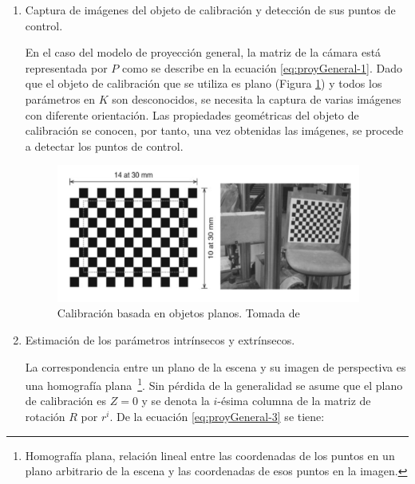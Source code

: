 \begin{enumerate}
	\item Captura de imágenes del objeto de calibración y detección de sus puntos de control.
	
	En el caso del modelo de proyección general, la matriz de la cámara está representada por $P$ como se describe en la ecuación \ref{eq:proyGeneral-1}. Dado que el objeto de calibración que se utiliza es plano (Figura \ref{fig:chess}) y todos los parámetros en $K$ son desconocidos, se necesita la captura de varias imágenes con diferente orientación. Las propiedades geométricas del objeto de calibración se conocen, por tanto, una vez obtenidas las imágenes, se procede a detectar los puntos de control.
	
	\begin{figure}[ht]
		\centering
		\includegraphics[width=10cm]{./Graphics/chess.png}
		\caption{Calibración basada en objetos planos. Tomada de \cite{ching2022segm3d}}
		\label{fig:chess}
	\end{figure}
	\item Estimación de los parámetros intrínsecos y extrínsecos.
	
	La correspondencia entre un plano de la escena y su imagen de perspectiva es una homografía plana~\footnote{Homografía plana, relación lineal entre las coordenadas de los puntos en un plano arbitrario de la escena y las coordenadas de esos puntos en la imagen.}. Sin pérdida de la generalidad se asume que el plano de calibración es $Z = 0$ y se denota la $i$-ésima columna de la matriz de rotación $R$ por $r^i$. De la ecuación \ref{eq:proyGeneral-3} se tiene:
	

\end{enumerate}
